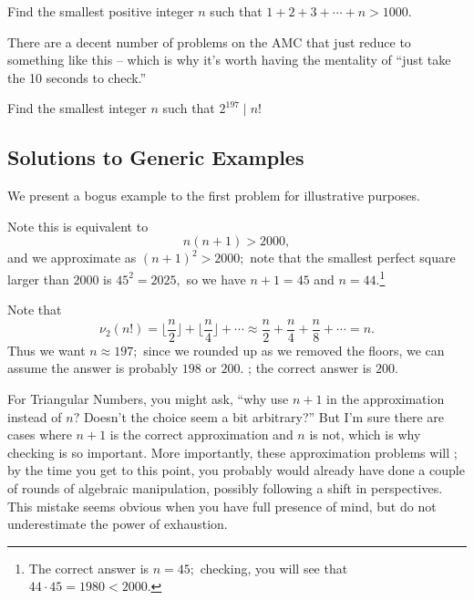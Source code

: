 \documentclass{article}
\begin{document}
\begin{exam}
Find the smallest positive integer $n$ such that $1+2+3+\cdots+n>1000.$
\end{exam}

There are a decent number of problems on the AMC that just reduce to something like this -- which is why it's worth having the mentality of ``just take the 10 seconds to check.''

\begin{exam}
Find the smallest integer $n$ such that $2^{197}\mid n!$
\end{exam}

\pagebreak

\subsection{Solutions to Generic Examples}

We present a bogus example to the first problem for illustrative purposes.

\begin{sol}
Note this is equivalent to
\[n(n+1)>2000,\]
and we approximate as $(n+1)^2>2000;$ note that the smallest perfect square larger than $2000$ is $45^2=2025,$ so we have $n+1=45$ and $n=44.$\footnote{The correct answer is $n=45;$ checking, you will see that $44\cdot 45=1980<2000.$}
\end{sol}

\begin{sol}
Note that
\[\nu_2(n!)=\lfloor\frac{n}{2}\rfloor+\lfloor\frac{n}{4}\rfloor+\cdots\approx \frac{n}{2}+\frac{n}{4}+\frac{n}{8}+\cdots=n.\]
Thus we want $n\approx 197;$ since we rounded up as we removed the floors, we can assume the answer is probably $198$ or $200.$ ; the correct answer is $200.$
\end{sol}

For Triangular Numbers, you might ask, ``why use $n+1$ in the approximation instead of $n?$ Doesn't the choice seem a bit arbitrary?'' But I'm sure there are cases where $n+1$ is the correct approximation and $n$ is not, which is why checking is so important. More importantly, these approximation problems will ; by the time you get to this point, you probably would already have done a couple of rounds of algebraic manipulation, possibly following a shift in perspectives. This mistake seems obvious when you have full presence of mind, but do not underestimate the power of exhaustion.
\end{document}
